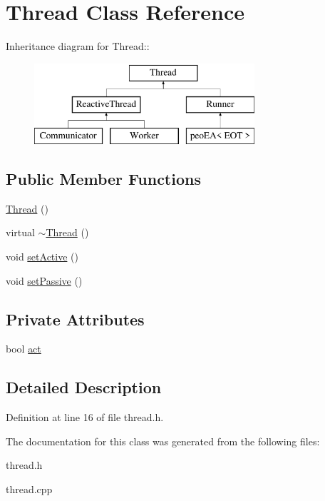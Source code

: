 \hypertarget{classThread}{
\section{Thread Class Reference}
\label{classThread}
}
Inheritance diagram for Thread::\begin{figure}[H]
\begin{center}
\leavevmode
\includegraphics[height=3cm]{classThread}
\end{center}
\end{figure}
\subsection*{Public Member Functions}
\begin{CompactItemize}
\item 
\hypertarget{classThread_95c703fb8f2f27cb64f475a8c940864a}{
\hyperlink{classThread_95c703fb8f2f27cb64f475a8c940864a}{Thread} ()}
\label{classThread_95c703fb8f2f27cb64f475a8c940864a}

\item 
\hypertarget{classThread_37d9edd3a1a776cbc27dedff949c9726}{
virtual \hyperlink{classThread_37d9edd3a1a776cbc27dedff949c9726}{$\sim$Thread} ()}
\label{classThread_37d9edd3a1a776cbc27dedff949c9726}

\item 
\hypertarget{classThread_e197c46f8f62ecce6d2a7fe95bdc5b38}{
void \hyperlink{classThread_e197c46f8f62ecce6d2a7fe95bdc5b38}{set\-Active} ()}
\label{classThread_e197c46f8f62ecce6d2a7fe95bdc5b38}

\item 
\hypertarget{classThread_20632ffe9ddfa2a478afb0c84dc1096b}{
void \hyperlink{classThread_20632ffe9ddfa2a478afb0c84dc1096b}{set\-Passive} ()}
\label{classThread_20632ffe9ddfa2a478afb0c84dc1096b}

\end{CompactItemize}
\subsection*{Private Attributes}
\begin{CompactItemize}
\item 
\hypertarget{classThread_1b155d63bca3096ac4a1d039aea83c7c}{
bool \hyperlink{classThread_1b155d63bca3096ac4a1d039aea83c7c}{act}}
\label{classThread_1b155d63bca3096ac4a1d039aea83c7c}

\end{CompactItemize}


\subsection{Detailed Description}




Definition at line 16 of file thread.h.

The documentation for this class was generated from the following files:\begin{CompactItemize}
\item 
thread.h\item 
thread.cpp\end{CompactItemize}
